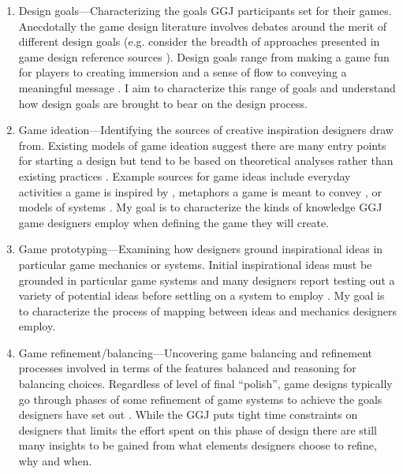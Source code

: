 \documentclass[]{article}
\begin{document}
\begin{enumerate}
\item Design goals---Characterizing the goals GGJ participants set for their games. Anecdotally the game design literature involves debates around the merit of different design goals (e.g. consider the breadth of approaches presented in game design reference sources \cite{fullerton2008:playcentric}\cite{salen2003:rulesplay} \cite{salen2006:reader} \cite{schell2008:gamedesign}). Design goals range from making a game fun for players \cite{koster2005:theory-fun} to creating immersion and a sense of flow \cite{fullerton2006:cloudgame} to conveying a meaningful message \cite{bogost2007:persuasive}. I aim to characterize this range of goals and understand how design goals are brought to bear on the design process.
\item Game ideation---Identifying the sources of creative inspiration designers draw from. Existing models of game ideation suggest there are many entry points for starting a design but tend to be based on theoretical analyses rather than existing practices \cite{hunicke2004:mda}. Example sources for game ideas include everyday activities a game is inspired by \cite{treanor2010:kaboom}, metaphors a game is meant to convey \cite{rusch2008:game-metaphor}, or models of systems \cite{crawford1984:gamedesign}. My goal is to characterize the kinds of knowledge GGJ game designers employ when defining the game they will create.
\item Game prototyping---Examining how designers ground inspirational ideas in particular game mechanics or systems. Initial inspirational ideas must be grounded in particular game systems and many designers report testing out a variety of potential ideas before settling on a system to employ \cite{gabler2005:7day-prototype} \cite{manker2011:prototyping} \cite{nelson2009:reqanal}. My goal is to characterize the process of mapping between ideas and mechanics designers employ.
\item Game refinement/balancing---Uncovering game balancing and refinement processes involved in terms of the features balanced and reasoning for balancing choices. Regardless of level of final ``polish'', game designs typically go through phases of some refinement of game systems to achieve the goals designers have set out \cite{schell2008:gamedesign}. While the GGJ puts tight time constraints on designers that limits the effort spent on this phase of design there are still many insights to be gained from what elements designers choose to refine, why and when.
\end{enumerate}
\end{document}

